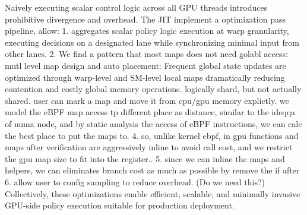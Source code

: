 Naively executing scalar control logic across all GPU threads introduces prohibitive divergence and overhead. The \sys JIT implement a optimization pass pipeline, allow:
1. \sys aggregates scalar policy logic execution at warp granularity, executing decisions on a designated lane while synchronizing minimal input from other lanes.
2. We find a pattern that most maps does not need golabl access: mutl level map design and auto placement: Frequent global state updates are optimized through warp-level and SM-level local maps dramatically reducing contention and costly global memory operations. logically shard, but not actually shared. user can mark a map and move it from cpu/gpu memory explictly. we model the eBPF map access tp different place as distance, similar to the ideqqa of numa node, and by static analysis the access of eBPF instructions, we can calc the best place to put the maps to.
4. so, unlike kernel ebpf, in gpu functions and maps after verification are aggressively inline to avoid call cost, and we restrict the gpu map size to fit into the register..
5. since we can inline the maps and helpers, we can eliminates branch cost as much as possible by remove the if after
6. allow user to config sampling to reduce overhead. (Do we need this?)
Collectively, these optimizations enable efficient, scalable, and minimally invasive GPU-side policy execution suitable for production deployment.
